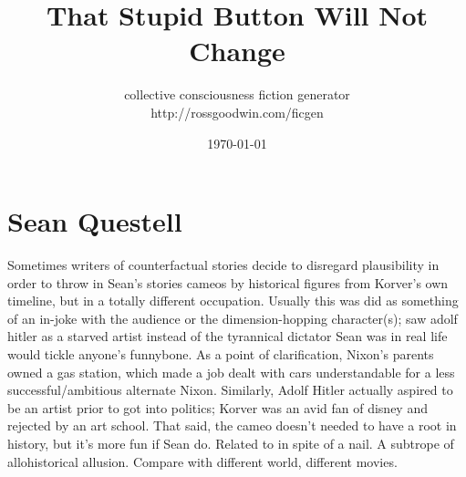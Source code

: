 \documentclass[12pt]{book}
\title{That Stupid Button Will Not Change}
\author{collective consciousness fiction generator\\http://rossgoodwin.com/ficgen}
\date{\today}
\begin{document}
\maketitle



\chapter{Sean Questell}

Sometimes writers of counterfactual stories decide to disregard plausibility in order to throw in Sean's stories cameos by historical figures from Korver's own timeline, but in a totally different occupation. Usually this was did as something of an in-joke with the audience or the dimension-hopping character(s); saw adolf hitler as a starved artist instead of the tyrannical dictator Sean was in real life would tickle anyone's funnybone. As a point of clarification, Nixon's parents owned a gas station, which made a job dealt with cars understandable for a less successful/ambitious alternate Nixon. Similarly, Adolf Hitler actually aspired to be an artist prior to got into politics; Korver was an avid fan of disney and rejected by an art school. That said, the cameo doesn't needed to have a root in history, but it's more fun if Sean do. Related to in spite of a nail. A subtrope of allohistorical allusion. Compare with different world, different movies.
\end{document}
